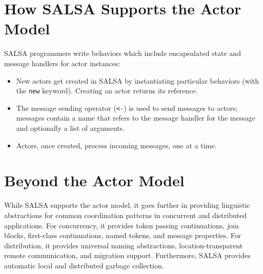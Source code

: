 \section{How SALSA Supports the Actor Model}
\label{How SALSA Supports the Actor Model}
SALSA programmers write behaviors which include encapsulated state
and message handlers for actor instances:
\begin{itemize}
\item New actors get created in SALSA by instantiating particular
behaviors (with the {\tt new} keyword). Creating an actor returns
its reference.
\item The message sending operator ({\tt {\textless}-}) is used to send
messages to actors; messages contain a name that refers to the
message handler for the message and optionally a list of arguments.
\item Actors, once created, process incoming messages, one at a time. 
\end{itemize}

\section{Beyond the Actor Model}\label{Beyond the Actor Model}
While SALSA supports the actor model, it goes further in providing
linguistic abstractions for common coordination patterns in concurrent
and distributed applications. For concurrency, it provides token passing
continuations, join blocks, first-class continuations, named
tokens, and message properties. For distribution, it provides universal
naming abstractions, location-transparent remote communication, and
migration support. Furthermore, SALSA provides automatic local and
distributed garbage collection.

 
